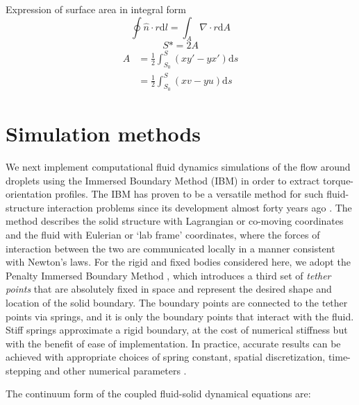\documentclass{jfm}
\begin{document}
Expression of surface area in integral form\\
\begin{equation}
\oint\hat{n}\cdot{r}\mathrm{d}l=\int_{A}\nabla\cdot{r}\mathrm{d}A
\end{equation}
\begin{equation}
S*=2A
\end{equation}
\begin{equation}
\begin{aligned}
A&=\frac{1}{2}\int_{S_0}^{S}(xy'-yx')\mathrm{d}s\\
&=\frac{1}{2}\int_{S_0}^{S}(xv-yu)\mathrm{d}s
\end{aligned}
\end{equation}


\section{Simulation methods\label{sec:simulation}}

We next implement computational fluid dynamics simulations of the flow around droplets using the Immersed Boundary Method (IBM) in order to extract torque-orientation profiles. The IBM has proven to be a versatile method for such fluid-structure interaction problems since its development almost forty years ago \citep{peskin1972flow,mcqueen1997shared,arthurs1998modeling,lai2000immersed,griffith2009simulating,balboa2011staggered,devendran2012immersed,ibamradaptive}. The method describes the solid structure with Lagrangian or co-moving coordinates and the fluid with Eulerian or `lab frame' coordinates, where the forces of interaction between the two are communicated locally in a manner consistent with Newton's laws. For the rigid and fixed bodies considered here, we adopt the Penalty Immersed Boundary Method \citep{kim2016penalty}, which introduces a third set of \textit{tether points} that are absolutely fixed in space and represent the desired shape and location of the solid boundary. The boundary points are connected to the tether points via springs, and it is only the boundary points that interact with the fluid. Stiff springs approximate a rigid boundary, at the cost of numerical stiffness but with the benefit of ease of implementation. In practice, accurate results can be achieved with appropriate choices of spring constant, spatial discretization, time-stepping and other numerical parameters \citep{kim2016penalty}.

The continuum form of the coupled fluid-solid dynamical equations are:
\end{document}
